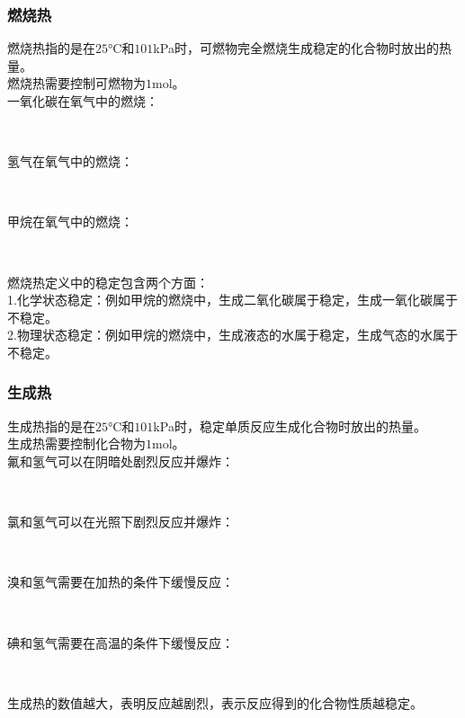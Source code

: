 \documentclass[UTF8]{ctexart}
\begin{document}
\newpage

\subsubsection{燃烧热}
    燃烧热指的是在$25$\si{\degreeCelsius}和$101$\si{kPa}时，可燃物完全燃烧生成稳定的化合物时放出的热量。\\[3mm]
    燃烧热需要控制可燃物为$1$\si{mol}。\\[3mm]
    一氧化碳在氧气中的燃烧：
    \begin{center}
        \\[4mm]
    \end{center}
    氢气在氧气中的燃烧：
    \begin{center}
        \\[4mm]
    \end{center}
    甲烷在氧气中的燃烧：
    \begin{center}
        \\[4mm]
    \end{center}
    燃烧热定义中的稳定包含两个方面：\\[3mm]
    1.化学状态稳定：例如甲烷的燃烧中，生成二氧化碳属于稳定，生成一氧化碳属于不稳定。\\[3mm]
    2.物理状态稳定：例如甲烷的燃烧中，生成液态的水属于稳定，生成气态的水属于不稳定。

\subsubsection{生成热}
    生成热指的是在$25$\si{\degreeCelsius}和$101$\si{kPa}时，稳定单质反应生成化合物时放出的热量。\\[3mm]
    生成热需要控制化合物为$1$\si{mol}。\\[3mm]
    氟和氢气可以在阴暗处剧烈反应并爆炸：
    \begin{center}
        \\[6mm]
    \end{center}
    氯和氢气可以在光照下剧烈反应并爆炸：
    \begin{center}
        \\[6mm]
    \end{center}
    溴和氢气需要在加热的条件下缓慢反应：
    \begin{center}
        \\[6mm]
    \end{center}
    碘和氢气需要在高温的条件下缓慢反应：
    \begin{center}
        \\[6mm]
    \end{center}
    生成热的数值越大，表明反应越剧烈，表示反应得到的化合物性质越稳定。
\end{document}
